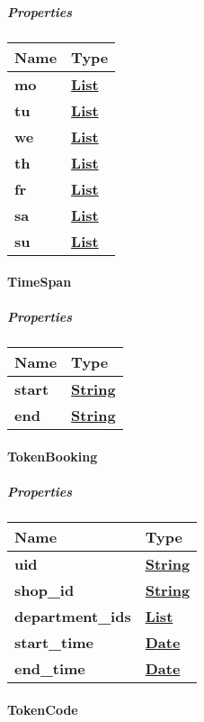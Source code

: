 \hypertarget{properties-9}{%
\subparagraph{Properties}\label{properties-9}}

\begin{longtable}[]{@{}ll@{}}
\toprule
Name & Type\tabularnewline
\midrule
\endhead
\textbf{mo} & \href{TimeSpan.md}{\textbf{List}}\tabularnewline
\textbf{tu} & \href{TimeSpan.md}{\textbf{List}}\tabularnewline
\textbf{we} & \href{TimeSpan.md}{\textbf{List}}\tabularnewline
\textbf{th} & \href{TimeSpan.md}{\textbf{List}}\tabularnewline
\textbf{fr} & \href{TimeSpan.md}{\textbf{List}}\tabularnewline
\textbf{sa} & \href{TimeSpan.md}{\textbf{List}}\tabularnewline
\textbf{su} & \href{TimeSpan.md}{\textbf{List}}\tabularnewline
\bottomrule
\end{longtable}

\hypertarget{timespan}{%
\paragraph{TimeSpan}\label{timespan}}

\hypertarget{properties-10}{%
\subparagraph{Properties}\label{properties-10}}

\begin{longtable}[]{@{}ll@{}}
\toprule
Name & Type\tabularnewline
\midrule
\endhead
\textbf{start} & \href{string.md}{\textbf{String}}\tabularnewline
\textbf{end} & \href{string.md}{\textbf{String}}\tabularnewline
\bottomrule
\end{longtable}

\hypertarget{tokenbooking}{%
\paragraph{TokenBooking}\label{tokenbooking}}

\hypertarget{properties-11}{%
\subparagraph{Properties}\label{properties-11}}

\begin{longtable}[]{@{}ll@{}}
\toprule
Name & Type\tabularnewline
\midrule
\endhead
\textbf{uid} & \href{string.md}{\textbf{String}}\tabularnewline
\textbf{shop\_id} & \href{string.md}{\textbf{String}}\tabularnewline
\textbf{department\_ids} &
\href{string.md}{\textbf{List}}\tabularnewline
\textbf{start\_time} & \href{DateTime.md}{\textbf{Date}}\tabularnewline
\textbf{end\_time} & \href{DateTime.md}{\textbf{Date}}\tabularnewline
\bottomrule
\end{longtable}

\hypertarget{tokencode}{%
\paragraph{TokenCode}\label{tokencode}}

